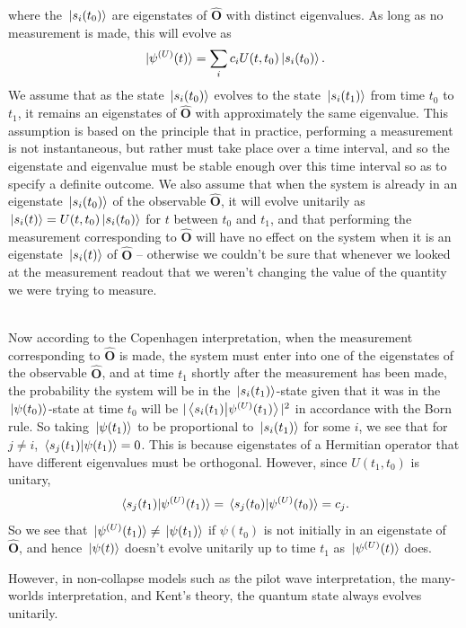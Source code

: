 { where the $\ket*{s_i(t_0)}$ are eigenstates of $\hat{\bm{O}}$ with distinct eigenvalues. As long as no measurement is made, this will evolve as 
 $$\ket*{\psi^{(U)}(t)}=\sum_i c_iU(t,t_0)\ket*{s_i(t_0)}.$$  
 We assume that as the state $\ket*{s_i(t_0)}$ evolves to the state $\ket*{s_i(t_1)}$ from time $t_0$ to $t_1$, it remains an eigenstates of $\hat{\bm{O}}$ with approximately the same eigenvalue. This assumption is based on the principle that in practice, performing a measurement is not instantaneous, but rather must take place over a time interval, and so the eigenstate and eigenvalue must be stable enough over this time interval so as to specify a definite outcome. We also assume that when the system is already in an eigenstate $\ket*{s_i(t_0)}$ of the observable $\hat{\bm{O}}$, it will evolve unitarily as $\ket*{s_i(t)}=U(t,t_0)\ket*{s_i(t_0)}$ for $t$ between $t_0$ and $t_1$, and that performing the measurement corresponding to $\hat{\bm{O}}$ will have no effect on the system when it is an eigenstate  $\ket*{s_i(t)}$ of $\hat{\bm{O}}$ -- otherwise we couldn't be sure that whenever we looked at the measurement readout that we weren't changing the value of the quantity we were trying to measure. \strut \\[\baselineskip]
Now according to the Copenhagen interpretation, when the measurement corresponding to $\hat{\bm{O}}$ is made, the system must enter into one of the eigenstates of the observable $\hat{\bm{O}}$, and at time $t_1$ shortly after the measurement has been made, the probability the system will be in the $\ket*{s_i(t_1)}$-state given that it was in the $\ket*{\psi(t_0)}$-state at time $t_0$ will be $|\ip{s_i(t_1)}{\psi^{(U)}(t_1)}|^2$ in accordance with the Born rule. So taking $\ket*{\psi(t_1)}$ to be proportional to $\ket*{s_i(t_1)}$ for some $i$, we see that for $j\neq i$, $\ip*{s_j(t_1)}{\psi(t_1)}=0$. This is because eigenstates of a Hermitian operator that have different eigenvalues must be orthogonal. However, since $U(t_1,t_0)$ is unitary,
 $$\ip*{s_j(t_1)}{\psi^{(U)}(t_1)}=\ip*{s_j(t_0)}{\psi^{(U)}(t_0)}=c_j.$$
 So we see that $\ket*{\psi^{(U)}(t_1)}\neq\ket*{\psi(t_1)}$ if $\psi(t_0)$ is not initially in an eigenstate of $\hat{\bm{O}}$, and hence $\ket*{\psi(t)}$ doesn't evolve unitarily up to time $t_1$ as $\ket*{\psi^{(U)}(t)}$ does.} However, in non-collapse models  such as the pilot wave interpretation, the many-worlds interpretation, and Kent's theory, the quantum state always evolves unitarily. 

